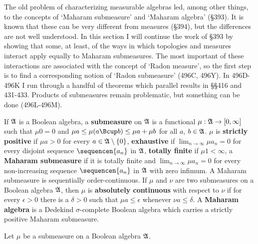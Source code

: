 
\def\chaptername{Further topics}
\def\sectionname{Maharam submeasures}


The old problem of characterizing measurable algebras led, among other
things, to the concepts of `Maharam submeasure' and `Maharam algebra'
(\S393).   It is known that these can be very different from measures
(\S394), but the differences are not well understood.   In this section I
will continue the work of \S393 by showing that some, at least, of the
ways in which topologies and measures interact apply equally to Maharam
submeasures.   The most important of these interactions are associated with
the concept of `Radon measure', so the first step is to find a
corresponding notion of `Radon submeasure' (496C, 496Y).   In
496D-496K %
I run
through a handful of theorems which parallel results in \S\S416 and
431-433.  %
Products of submeasures remain problematic, but something can be
done (496L-496M).

If $\frak A$ is a Boolean algebra, a {\bf submeasure} on $\frak A$ is a
functional $\mu:\frak A\to[0,\infty]$
such that $\mu 0 = 0$ and $\mu a\le\mu(a\Bcup b)\le\mu a+\mu b$ for all
$a$, $b\in\frak A$.
$\mu$ is {\bf strictly positive} if $\mu a>0$ for every
$a\in\frak A\setminus\{0\}$, {\bf exhaustive} if
$\lim_{n\to\infty}\mu a_n=0$ for every disjoint sequence $\sequencen{a_n}$
in $\frak A$,
{\bf totally finite} if $\mu 1<\infty$,
a {\bf Maharam submeasure} if it is totally finite and
$\lim_{n\to\infty}\mu a_n=0$ for every
non-increasing sequence $\sequencen{a_n}$ in $\frak A$ with zero
infimum.
A Maharam submeasure is sequentially
order-continuous.
If $\mu$ and $\nu$ are two submeasures on a Boolean algebra $\frak A$, then
$\mu$ is {\bf absolutely continuous} with respect to $\nu$ if for every
$\epsilon>0$ there is a $\delta>0$ such that $\mu a\le\epsilon$ whenever
$\nu a\le\delta$.
A {\bf Maharam algebra} is a Dedekind $\sigma$-complete Boolean algebra
which carries a strictly positive Maharam
submeasure.

 Let $\mu$ be a submeasure on a Boolean algebra $\frak A$.

